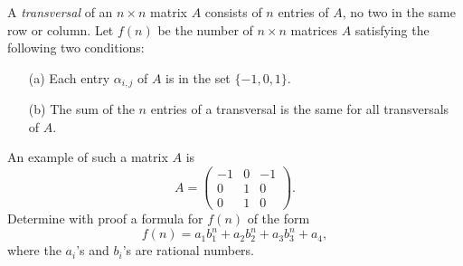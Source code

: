 A \emph{transversal} of an $n\times n$ matrix $A$ consists of $n$
entries of $A$, no two in the same row or column. Let $f(n)$ be the
number of $n \times n$ matrices $A$ satisfying the following two
conditions:
\begin{enumerate}
\item[(a)] Each entry $\alpha_{i,j}$ of $A$ is in the set
$\{-1,0,1\}$.
\item[(b)] The sum of the $n$ entries of a transversal is the same for
all transversals of $A$.
\end{enumerate}
An example of such a matrix $A$ is
\[
A = \left( \begin{array}{ccc} -1 & 0 & -1 \\ 0 & 1 & 0 \\ 0 & 1 & 0
\end{array}
\right).
\]
Determine with proof a formula for $f(n)$ of the form
\[
f(n) = a_1 b_1^n + a_2 b_2^n + a_3 b_3^n + a_4,
\]
where the $a_i$'s and $b_i$'s are rational numbers.
